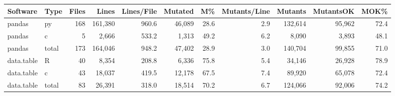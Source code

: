 \begin{tabular}{llrrrrrrrrr}
  \hline
Software & Type & Files & Lines & Lines/File & Mutated & M\% & Mutants/Line & Mutants & MutantsOK & MOK\% \\ 
  \hline
pandas & py & 168 & 161,380 & 960.6 & 46,089 & 28.6 & 2.9 & 132,614 & 95,962 & 72.4 \\ 
  pandas & c &  5 & 2,666 & 533.2 & 1,313 & 49.2 & 6.2 & 8,090 & 3,893 & 48.1 \\ 
  pandas & total & 173 & 164,046 & 948.2 & 47,402 & 28.9 & 3.0 & 140,704 & 99,855 & 71.0 \\ 
  data.table & R & 40 & 8,354 & 208.8 & 6,336 & 75.8 & 5.4 & 34,146 & 26,928 & 78.9 \\ 
  data.table & c & 43 & 18,037 & 419.5 & 12,178 & 67.5 & 7.4 & 89,920 & 65,078 & 72.4 \\ 
  data.table & total & 83 & 26,391 & 318.0 & 18,514 & 70.2 & 6.7 & 124,066 & 92,006 & 74.2 \\ 
   \hline
\end{tabular}

